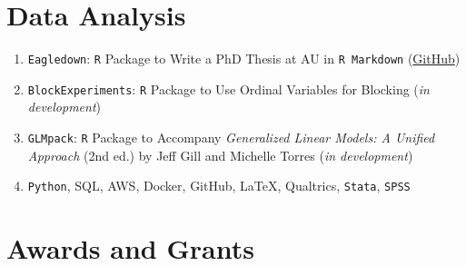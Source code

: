 \documentclass[11pt]{article}
\begin{document}
\begin{flushleft}
\section*{Data Analysis}
\begin{enumerate}[leftmargin=!,labelindent=20pt,itemindent=-20pt]
\item[] {\tt Eagledown}: {\tt R} Package to Write a PhD Thesis at AU in {\tt R Markdown} (\href{https://github.com/SimonHeuberger/eagledown}{GitHub})
\vspace{-0.27cm}
\item[] {\tt BlockExperiments}: {\tt R} Package to Use Ordinal Variables for Blocking (\textit{in development})
\vspace{-0.27cm}
\item[] {\tt GLMpack}: {\tt R} Package to Accompany \textit{Generalized Linear Models: A Unified Approach} (2nd ed.) by Jeff Gill and Michelle Torres (\textit{in development})
\vspace{-0.27cm}
\item[] \texttt{Python}, SQL, AWS, Docker, GitHub, \LaTeX, Qualtrics, \texttt{Stata}, \texttt{SPSS} 
\end{enumerate}




\section*{Awards and Grants}


\end{flushleft}
\end{document}
